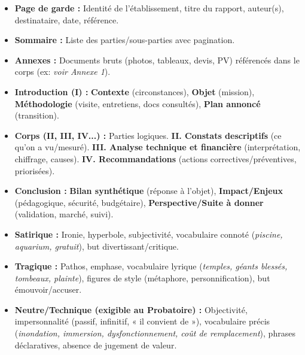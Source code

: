 \documentclass[11pt]{article}
\newcounter{popsec}
\newcounter{popsub}
\newcommand{\courssub}[1]{%
  \stepcounter{popsub}%
  \par\vspace{9pt}\noindent{\popxbold\fontsize{11.5}{13}\selectfont\color{popink}{\color{poporange}\thepopsec.\thepopsub}\hspace{6pt}#1}\par\nopagebreak\vspace{4pt}
}
\begin{document}
\courssub{Ressources à mobiliser}
\begin{definition}
\begin{itemize}
    \item \textbf{Page de garde :} Identité de l'établissement, titre du rapport, auteur(s), destinataire, date, référence.
    \item \textbf{Sommaire :} Liste des parties/sous-parties avec pagination.
    \item \textbf{Annexes :} Documents bruts (photos, tableaux, devis, PV) référencés dans le corps (ex: \emph{voir Annexe 1}).
\end{itemize}
\end{definition}

\begin{definition}
\begin{itemize}
    \item \textbf{Introduction (I) :} \textbf{Contexte} (circonstances), \textbf{Objet} (mission), \textbf{Méthodologie} (visite, entretiens, docs consultés), \textbf{Plan annoncé} (transition).
    \item \textbf{Corps (II, III, IV...) :} Parties logiques. \textbf{II. Constats descriptifs} (ce qu'on a vu/mesuré). \textbf{III. Analyse technique et financière} (interprétation, chiffrage, causes). \textbf{IV. Recommandations} (actions correctives/préventives, priorisées).
    \item \textbf{Conclusion :} \textbf{Bilan synthétique} (réponse à l'objet), \textbf{Impact/Enjeux} (pédagogique, sécurité, budgétaire), \textbf{Perspective/Suite à donner} (validation, marché, suivi).
\end{itemize}
\end{definition}

\begin{propriete}
\begin{itemize}
    \item \textbf{Satirique :} Ironie, hyperbole, subjectivité, vocabulaire connoté (\emph{piscine, aquarium, gratuit}), but divertissant/critique.
    \item \textbf{Tragique :} Pathos, emphase, vocabulaire lyrique (\emph{temples, géants blessés, tombeaux, plainte}), figures de style (métaphore, personnification), but émouvoir/accuser.
    \item \textbf{Neutre/Technique (exigible au Probatoire) :} Objectivité, impersonnalité (passif, infinitif, « il convient de »), vocabulaire précis (\emph{inondation, immersion, dysfonctionnement, coût de remplacement}), phrases déclaratives, absence de jugement de valeur.
\end{itemize}
\end{propriete}
\end{document}

